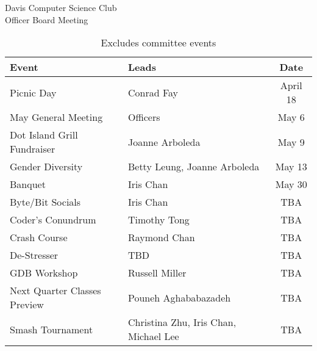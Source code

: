 \documentclass{article}
\begin{document}
\begin{Minutes}{Davis Computer Science Club\\Officer Board Meeting}
\begin{table}[h]
	\centering
	\renewcommand*{\arraystretch}{1.5}
	\begin{tabular}{l l c}
		Event
			&	Leads
			&	Date\\
		\hline
		Picnic Day
			&	Conrad Fay
			&	April 18\\
		May General Meeting
			&	Officers
			&	May 6\\
		Dot Island Grill Fundraiser
			&	Joanne Arboleda
			&	May 9\\
		Gender Diversity	
			&	Betty Leung, Joanne Arboleda	
			&	May 13\\
		Banquet
			&	Iris Chan
			&	May 30\\
		Byte/Bit Socials
			& 	Iris Chan
			&	TBA\\
		Coder's Conundrum	
			&	Timothy Tong	
			&	TBA\\
		Crash Course
			&	Raymond Chan
			&	TBA\\
		De-Stresser
			&	TBD
			&	TBA\\
		GDB Workshop		
			&	Russell Miller	
			&	TBA\\
		Next Quarter Classes Preview
			&	Pouneh Aghababazadeh
			&	TBA\\
		Smash Tournament	
			&	Christina Zhu, Iris Chan, Michael Lee
			&	TBA\\
	\end{tabular}
	\caption*{Excludes committee events}
\end{table}


\end{Minutes}
\end{document}
